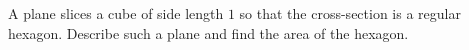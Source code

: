 A plane slices a cube of side length $1$ so that the cross-section is a regular hexagon. Describe such a plane and find the area of the hexagon.
